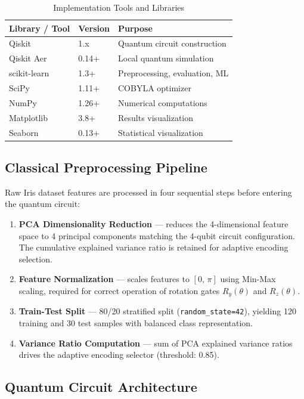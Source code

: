 \documentclass[conference]{IEEEtran}
\begin{document}
\begin{table}[h]
\caption{Implementation Tools and Libraries}
\label{tab:tools}
\centering
\begin{tabular}{lll}
\toprule
\textbf{Library / Tool} & \textbf{Version} & \textbf{Purpose} \\
\midrule
Qiskit        & 1.x    & Quantum circuit construction \\
Qiskit Aer    & 0.14+  & Local quantum simulation \\
scikit-learn  & 1.3+   & Preprocessing, evaluation, ML \\
SciPy         & 1.11+  & COBYLA optimizer \\
NumPy         & 1.26+  & Numerical computations \\
Matplotlib    & 3.8+   & Results visualization \\
Seaborn       & 0.13+  & Statistical visualization \\
\bottomrule
\end{tabular}
\end{table}

\subsection{Classical Preprocessing Pipeline}

Raw Iris dataset features are processed in four sequential steps before entering the quantum circuit:

\begin{enumerate}
  \item \textbf{PCA Dimensionality Reduction} — reduces the 4-dimensional feature space to 4 principal components matching the 4-qubit circuit configuration. The cumulative explained variance ratio is retained for adaptive encoding selection.
  \item \textbf{Feature Normalization} — scales features to $[0,\,\pi]$ using Min-Max scaling, required for correct operation of rotation gates $R_y(\theta)$ and $R_z(\theta)$.
  \item \textbf{Train-Test Split} — 80/20 stratified split (\texttt{random\_state=42}), yielding 120 training and 30 test samples with balanced class representation.
  \item \textbf{Variance Ratio Computation} — sum of PCA explained variance ratios drives the adaptive encoding selector (threshold: 0.85).
\end{enumerate}

\subsection{Quantum Circuit Architecture}
\end{document}
